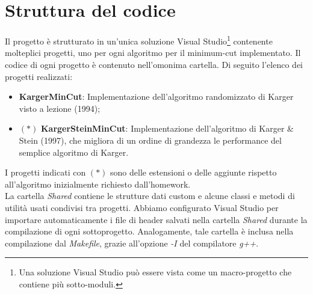 \section{Struttura del codice}
\label{cap:code-structure}

Il progetto è strutturato in un'unica soluzione Visual Studio\footnote{Una soluzione Visual Studio può essere vista come un macro-progetto che contiene più sotto-moduli.} contenente molteplici progetti, uno per ogni algoritmo per il minimum-cut implementato. Il codice di ogni progetto è contenuto nell'omonima cartella. Di seguito l'elenco dei progetti realizzati:

\begin{itemize}
    \item \textbf{KargerMinCut}: Implementazione dell'algoritmo randomizzato di Karger visto a lezione (1994);
    \item  $(*)$ \textbf{KargerSteinMinCut}: Implementazione dell'algoritmo di Karger \& Stein (1997), che migliora di un ordine di grandezza le performance del semplice algoritmo di Karger.
\end{itemize}

\noindent I progetti indicati con $(*)$ sono delle estensioni o delle aggiunte rispetto all'algoritmo inizialmente richiesto dall'homework.
\\

\noindent La cartella \textit{Shared} contiene le strutture dati custom e alcune classi e metodi di utilità usati
condivisi tra progetti. Abbiamo configurato Visual Studio per importare automaticamente i file di header salvati nella cartella \textit{Shared}
durante la compilazione di ogni sottoprogetto. Analogamente, tale cartella è inclusa nella compilazione dal \textit{Makefile}, grazie all'opzione \textit{-I} del compilatore \textit{g++}.

